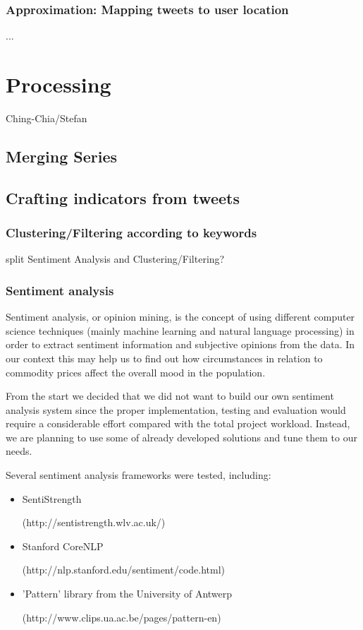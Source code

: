 \subsubsection*{Approximation: Mapping tweets to user location}
...

\section*{Processing}
Ching-Chia/Stefan
\subsection*{Merging Series}

\subsection*{Crafting indicators from tweets}
\subsubsection*{Clustering/Filtering according to keywords}
split Sentiment Analysis and Clustering/Filtering?

\subsubsection*{Sentiment analysis}
Sentiment analysis, or opinion mining, is the concept of using different computer science techniques (mainly machine learning and natural language processing) in order to extract sentiment information and subjective opinions from the data. In our context this may help us to find out how circumstances in relation to commodity prices affect the overall mood in the population.\par
From the start we decided that we did not want to build our own sentiment analysis system since the proper implementation, testing and evaluation would require a considerable effort compared with the total project workload. Instead, we are planning to use some of already developed solutions and tune them to our needs.

Several sentiment analysis frameworks were tested, including:

\begin{itemize}
\item SentiStrength \par (http://sentistrength.wlv.ac.uk/)

\item Stanford CoreNLP \par (http://nlp.stanford.edu/sentiment/code.html)

\item 'Pattern' library from the University of Antwerp \par (http://www.clips.ua.ac.be/pages/pattern-en)
\end{itemize}

